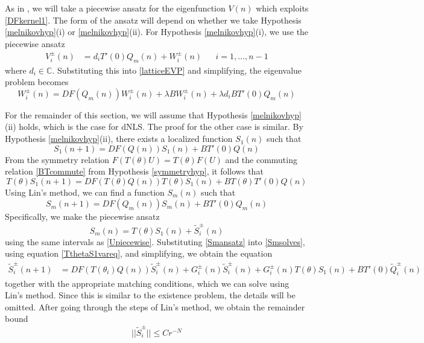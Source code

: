 \documentclass[12pt]{article}
\def\C{{\mathbb C}}
\begin{document}
As in \cite{Sandstede1998}, we will take a piecewise ansatz for the eigenfunction $V(n)$ which exploits \eqref{DFkernel1}. The form of the ansatz will depend on whether we take Hypothesis \ref{melnikovhyp}(i) or \ref{melnikovhyp}(ii). For Hypothesis \ref{melnikovhyp}(i), we use the piecewise ansatz
\begin{align*}
V_i^\pm(n) &= d_i T'(0) Q_m(n) + W_i^\pm(n) 
&& i = 1, \dots, n-1
\end{align*}
where $d_i \in \C$. Substituting this into \eqref{latticeEVP} and simplifying, the eigenvalue problem becomes
\begin{equation}\label{EVPhypi}
W_i^\pm(n) = DF(Q_m(n)) W_i^\pm(n) + \lambda B W_i^\pm(n) + \lambda d_i B T'(0)Q_m(n)
\end{equation}

For the remainder of this section, we will assume that Hypothesis \ref{melnikovhyp}(ii) holds, which is the case for dNLS. The proof for the other case is similar. By Hypothesis \ref{melnikovhyp}(ii), there exists a localized function $S_1(n)$ such that 
\begin{equation}\label{S1vareq}
S_1(n+1) = DF(Q(n)) S_1(n) + B T'(0) Q(n)
\end{equation}
From the symmetry relation $F(T(\theta)U) = T(\theta)F(U)$ and the commuting relation \eqref{BTcommute} from Hypothesis \ref{symmetryhyp}, it follows that
\begin{equation}\label{TthetaS1vareq}
T(\theta)S_1(n+1) = DF(T(\theta)Q(n)) T(\theta)S_1(n) + B T(\theta) T'(0)Q(n)
\end{equation}
Using Lin's method, we can find a function $S_m(n)$ such that
\begin{equation}\label{Smsolves}
S_m(n+1) = DF(Q_m(n)) S_m(n) + B T'(0) Q_m(n)
\end{equation}
Specifically, we make the piecewise ansatz 
\begin{equation}\label{Smansatz}
S_m(n) = T(\theta)S_1(n) + \tilde{S}_i^\pm(n)
\end{equation}
using the same intervals as \eqref{Upiecewise}. Substituting \eqref{Smansatz} into \eqref{Smsolves}, using equation \eqref{TthetaS1vareq}, and simplifying, we obtain the equation
\begin{align*}
\tilde{S}_i^\pm(n+1) 
&= DF(T(\theta_i)Q(n)) \tilde{S}_i^\pm(n)
+ G_i^\pm(n)\tilde{S}_i^\pm(n) + G_i^\pm(n) T(\theta)S_1(n) + B T'
(0) \tilde{Q}_i^\pm(n)
\end{align*}
together with the appropriate matching conditions, which we can solve using Lin's method. Since this is similar to the existence problem, the details will be omitted. After going through the steps of Lin's method, we obtain the remainder bound
\begin{equation}\label{Sipmbound}
|| \tilde{S}_i^\pm || \leq C r^{-N}
\end{equation}
\end{document}
